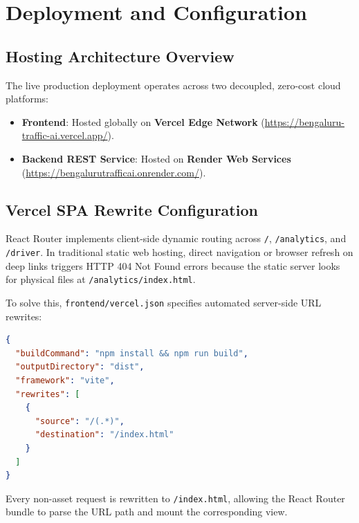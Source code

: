 \documentclass[11pt,a4paper,oneside]{report}
\begin{document}


\chapter{Deployment and Configuration}

\section{Hosting Architecture Overview}
The live production deployment operates across two decoupled, zero-cost cloud platforms:
\begin{itemize}[leftmargin=*]
    \item \textbf{Frontend}: Hosted globally on \textbf{Vercel Edge Network} (\url{https://bengaluru-traffic-ai.vercel.app/}).
    \item \textbf{Backend REST Service}: Hosted on \textbf{Render Web Services} (\url{https://bengalurutrafficai.onrender.com/}).
\end{itemize}

\section{Vercel SPA Rewrite Configuration}
React Router implements client-side dynamic routing across \texttt{/}, \texttt{/analytics}, and \texttt{/driver}. In traditional static web hosting, direct navigation or browser refresh on deep links triggers HTTP 404 Not Found errors because the static server looks for physical files at \texttt{/analytics/index.html}.

To solve this, \texttt{frontend/vercel.json} specifies automated server-side URL rewrites:
\begin{lstlisting}[language=json,caption={Vercel SPA Rewrite Rules (\texttt{frontend/vercel.json})}]
{
  "buildCommand": "npm install && npm run build",
  "outputDirectory": "dist",
  "framework": "vite",
  "rewrites": [
    {
      "source": "/(.*)",
      "destination": "/index.html"
    }
  ]
}
\end{lstlisting}
Every non-asset request is rewritten to \texttt{/index.html}, allowing the React Router bundle to parse the URL path and mount the corresponding view.
\end{document}
